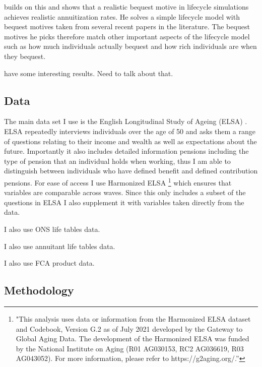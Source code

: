 \documentclass[12pt]{article}
\begin{document}
\cite{lockwood_red_2012} builds on this and shows that a realistic bequest motive in lifecycle simulations achieves
realistic annuitization rates. He solves a simple lifecycle model with bequest motives taken from several recent papers
in the literature. The bequest motives he picks therefore match other important aspects of the lifecycle model such
as how much individuals actually bequest and how rich individuals are when they bequest.

\cite{lockwood_aer_2018}

\cite{vidalmelia_lejarragagarcia_munich_2004} have some interesting results. Need to talk about that.


\subsection{Data}
The main data set I use is the English Longitudinal Study of Ageing (ELSA) \cite{main_elsa_citation}. ELSA repeatedly interviews
individuals over the age of 50 and asks them a range of questions relating to their income and wealth as well as expectations about
the future. Importantly it also includes detailed information pensions including the type of pension that an individual holds when
working, thus I am able to distinguish between individuals who have defined benefit and defined contribution pensions. For ease of access
I use Harmonized ELSA \footnote{"This analysis uses data or information from the Harmonized ELSA dataset and Codebook, Version G.2 as of
      July 2021 developed by the Gateway to Global Aging Data. The development of the Harmonized ELSA was funded by the National
      Institute on Aging (R01 AG030153, RC2 AG036619, R03 AG043052). For more information,
      please refer to https://g2aging.org/.”} which ensures that variables are comparable across waves. Since this only includes a
subset of the questions in ELSA I also supplement it with variables taken directly from the data.

I also use ONS life tables data.

I also use annuitant life tables data.

I also use FCA product data.



\subsection{Methodology}
\end{document}

